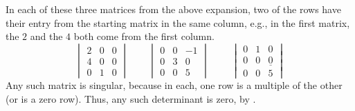 \begin{example} \label{ex:SamplePermExp}
In each of these three matrices from the above expansion, 
two of the rows have their entry from the starting matrix in the same column,
e.g.,
in the first matrix, the $2$ and the $4$ both come from the first column.
\begin{equation*}
  \begin{vmatrix}
     2               &0  &0   \\
     4               &0  &0  \\
     0               &1  &0
  \end{vmatrix}
  \qquad
  \begin{vmatrix}
     0               &0  &-1  \\
     0               &3  &0  \\
     0               &0  &5
  \end{vmatrix}
  \qquad\
  \begin{vmatrix}
     0               &1  &0   \\
     0               &0  &\underline{0}  \\
     0               &0  &5
  \end{vmatrix}
\end{equation*}
Any such matrix is singular, because in each,
one row is a multiple of the other (or is a zero row).
Thus, any such determinant is zero, by .


\end{example}
